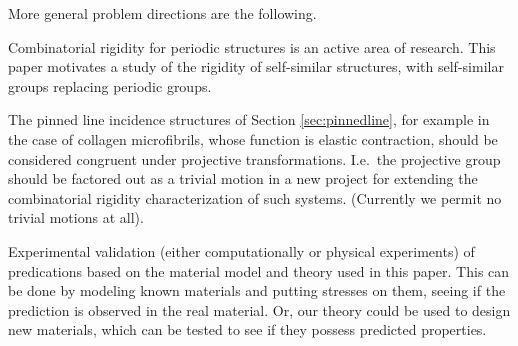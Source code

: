 More general problem directions are the following.
\begin{openproblem}
    Combinatorial rigidity for periodic structures is an active area of research. This paper motivates a study of the rigidity of self-similar structures, with self-similar groups replacing periodic groups.
\end{openproblem}

\begin{openproblem}
    The pinned line incidence structures of Section \ref{sec:pinnedline}, for example in the case of collagen microfibrils, whose function is elastic contraction, should be considered congruent under projective transformations. I.e.\ the projective group should be factored out as a trivial motion in a new project for extending the combinatorial rigidity characterization of such systems. (Currently we permit no trivial motions at all).
\end{openproblem}

\begin{openproblem}
    Experimental validation (either computationally or physical experiments) of predications based on the material model and theory used in this paper. This can be done by modeling known materials and putting stresses on them, seeing if the prediction is observed in the real material. Or, our theory could be used to design new materials, which can be tested to see if they possess predicted properties.
\end{openproblem}


